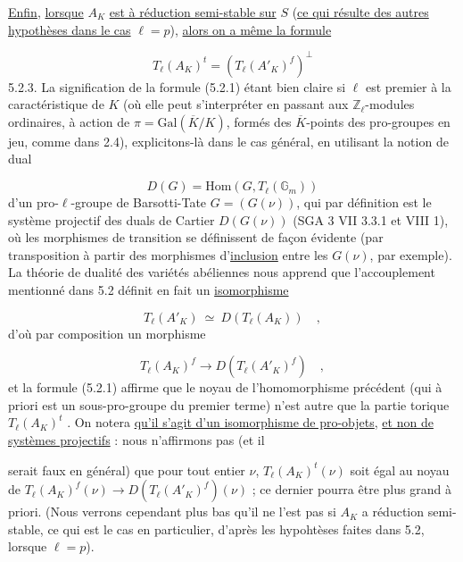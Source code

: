 
\underline{Enfin}, \underline{lorsque} $A_K$ \underline{est à réduction semi-stable sur} $S$ (\underline{ce qui résulte des autres hypothèses dans le cas} $\ell = p$), \underline{alors on a même la formule}

\begin{equation}\tag{5.2.2}
T_\ell(A_K)^t = (T_\ell(A'_K)^f)^\perp
\end{equation}
5.2.3. La signification de la formule (5.2.1) étant bien claire si $\ell$ est premier à la caractéristique de $K$ (où elle peut s'interpréter en passant aux $\mathbb{Z}_\ell$-modules ordinaires, à action de $\pi = \mathrm{Gal}(\overline{K}/K)$, formés des $\overline{K}$-points des pro-groupes en jeu, comme dans 2.4), explicitons-là dans le cas général, en utilisant la notion de dual

\begin{equation}\tag{5.2.3.1}
D(G) = \mathrm{Hom}(G,T_\ell(\mathbb{G}_m))
\end{equation}
d'un pro-$\ell$-groupe de Barsotti-Tate $G = (G(\nu))$, qui par définition est le système projectif des duals de Cartier $D(G(\nu))$ (SGA 3 VII 3.3.1 et VIII 1), où les morphismes de transition se définissent de façon évidente (par transposition à partir des morphismes d'\underline{inclusion} entre les $G(\nu)$, par exemple). La théorie de dualité des variétés abéliennes nous apprend que l'accouplement mentionné dans 5.2 définit en fait un \underline{isomorphisme}

\begin{equation}\tag{5.2.3.2}
T_\ell(A'_K) \ \simeq \ D(T_\ell(A_K)) \quad ,
\end{equation}
d'où par composition un morphisme

\begin{equation}\tag{5.2.3.3}
T_\ell(A_K)^f \longrightarrow D(T_\ell(A'_K)^f) \quad ,
\end{equation}
et la formule (5.2.1) affirme que le noyau de l'homomorphisme précédent (qui à priori est un sous-pro-groupe du premier terme) n'est autre que la partie torique $T_\ell(A_K)^t$ . On notera \underline{qu'il s'agit d'un isomorphisme de pro-objets}, \underline{et non de systèmes projectifs} : nous n'affirmons pas (et il



serait faux en général) que pour tout entier $\nu$, $T_\ell(A_K)^t(\nu)$ soit égal au noyau de $T_\ell(A_K)^f(\nu) \longrightarrow D(T_\ell(A'_K)^f)(\nu)$ ; ce dernier pourra être plus grand à priori. (Nous verrons cependant plus bas qu'il ne l'est pas si $A_K$ a réduction semi-stable, ce qui est le cas en particulier, d'après les hypohtèses faites dans 5.2, lorsque $\ell = p$).

